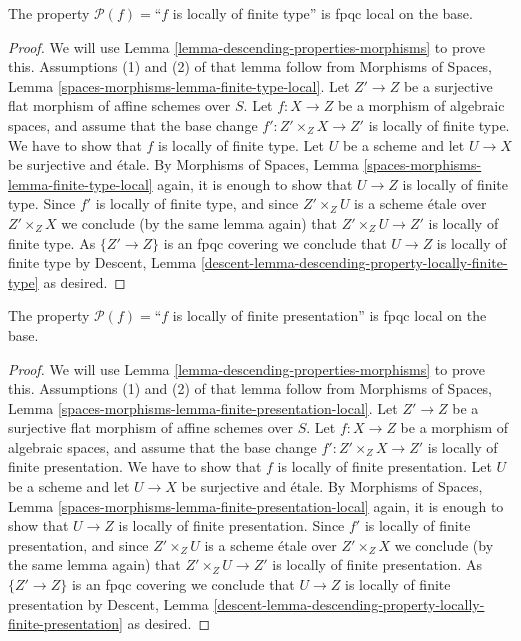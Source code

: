 \begin{lemma}
\label{lemma-descending-property-locally-finite-type}
The property $\mathcal{P}(f) =$``$f$ is locally of finite type''
is fpqc local on the base.
\end{lemma}

\begin{proof}
We will use
Lemma \ref{lemma-descending-properties-morphisms}
to prove this. Assumptions (1) and (2) of that lemma follow from
Morphisms of Spaces,
Lemma \ref{spaces-morphisms-lemma-finite-type-local}.
Let $Z' \to Z$ be a surjective flat morphism of affine schemes over $S$.
Let $f : X \to Z$ be a morphism of algebraic spaces, and assume
that the base change $f' : Z' \times_Z X \to Z'$ is locally of finite type.
We have to show that $f$ is locally of finite type. Let $U$ be a scheme
and let $U \to X$ be surjective and \'etale. By
Morphisms of Spaces,
Lemma \ref{spaces-morphisms-lemma-finite-type-local}
again, it is enough to show that $U \to Z$ is locally of finite type.
Since $f'$ is locally of finite type, and since $Z' \times_Z U$ is a
scheme \'etale over $Z' \times_Z X$ we conclude (by the same lemma again) that
$Z' \times_Z U \to Z'$ is locally of finite type.
As $\{Z' \to Z\}$ is an fpqc covering we conclude that
$U \to Z$ is locally of finite type by
Descent, Lemma \ref{descent-lemma-descending-property-locally-finite-type}
as desired.
\end{proof}

\begin{lemma}
\label{lemma-descending-property-locally-finite-presentation}
The property $\mathcal{P}(f) =$``$f$ is locally of finite presentation''
is fpqc local on the base.
\end{lemma}

\begin{proof}
We will use
Lemma \ref{lemma-descending-properties-morphisms}
to prove this. Assumptions (1) and (2) of that lemma follow from
Morphisms of Spaces,
Lemma \ref{spaces-morphisms-lemma-finite-presentation-local}.
Let $Z' \to Z$ be a surjective flat morphism of affine schemes over $S$.
Let $f : X \to Z$ be a morphism of algebraic spaces, and assume
that the base change $f' : Z' \times_Z X \to Z'$ is locally of
finite presentation.
We have to show that $f$ is locally of finite presentation. Let $U$ be a scheme
and let $U \to X$ be surjective and \'etale. By
Morphisms of Spaces,
Lemma \ref{spaces-morphisms-lemma-finite-presentation-local}
again, it is enough to show that $U \to Z$ is locally of finite presentation.
Since $f'$ is locally of finite presentation, and since $Z' \times_Z U$ is a
scheme \'etale over $Z' \times_Z X$ we conclude (by the same lemma again) that
$Z' \times_Z U \to Z'$ is locally of finite presentation.
As $\{Z' \to Z\}$ is an fpqc covering we conclude that
$U \to Z$ is locally of finite presentation by
Descent,
Lemma \ref{descent-lemma-descending-property-locally-finite-presentation}
as desired.
\end{proof}

